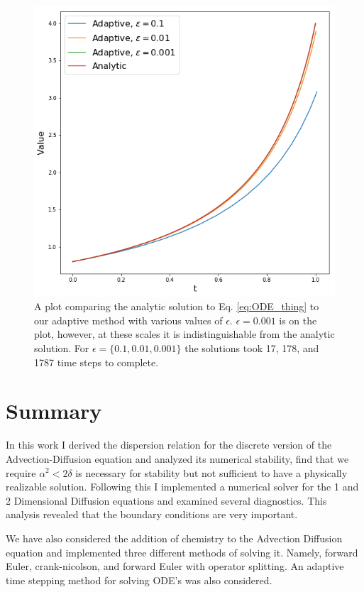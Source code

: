 \documentclass[]{article}
\begin{document}
\begin{figure}
	\centering
	\includegraphics[width=\textwidth]{figures/adaptive.png}
\caption{A plot comparing the analytic solution to Eq. \ref{eq:ODE_thing} to our adaptive method with various values of $\epsilon$. $\epsilon = 0.001$ is on the plot, however, at these scales it is indistinguishable from the analytic solution. For $\epsilon = \{0.1, 0.01, 0.001\}$ the solutions took 17, 178, and 1787 time steps to complete.  }
	\label{fig:adaptive}
\end{figure}
\section{Summary}
In this work I derived the dispersion relation for the discrete version of the Advection-Diffusion equation and analyzed its numerical stability, find that we require $\alpha^2 < 2\delta$ is necessary for stability but not sufficient to have a physically realizable solution. Following this I implemented a numerical solver for the 1 and 2 Dimensional Diffusion equations and examined several diagnostics. This analysis revealed that the boundary conditions are very important.

We have also considered the addition of chemistry to the Advection Diffusion equation and implemented three different methods of solving it. Namely, forward Euler, crank-nicolson, and forward Euler with operator splitting. An adaptive time stepping method for solving ODE's was also considered. 
 
\end{document}
